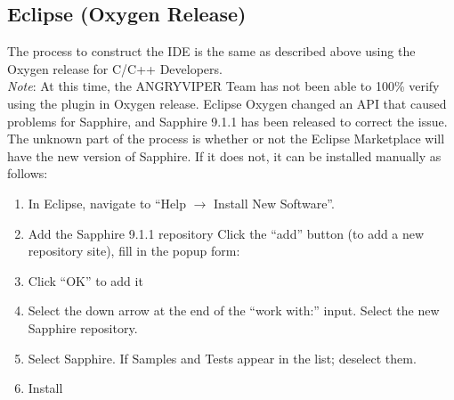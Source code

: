 \begin{appendices}
\subsection{Eclipse (Oxygen Release)}
The process to construct the IDE is the same as described above using the Oxygen release for C/C++ Developers. \\

\textit{Note}: At this time, the ANGRYVIPER Team has not been able to 100\% verify using the plugin in Oxygen release. Eclipse Oxygen changed an API that caused problems for Sapphire, and Sapphire 9.1.1 has been released to correct the issue. The unknown part of the process is whether or not the Eclipse Marketplace will have the new version of Sapphire. If it does not, it can be installed manually as follows:
\begin{enumerate}
\item In Eclipse, navigate to ``Help $\rightarrow$ Install New Software''.
\item Add the Sapphire 9.1.1 repository
\subitem Click the ``add'' button (to add a new repository site), fill in the popup form:
\subitem {}
\subitem {}
\item Click ``OK'' to add it
\item Select the down arrow at the end of the ``work with:'' input. Select the new Sapphire repository.
\item Select Sapphire. If Samples and Tests appear in the list; deselect them.
\item Install
\end{enumerate}

\end{appendices}


